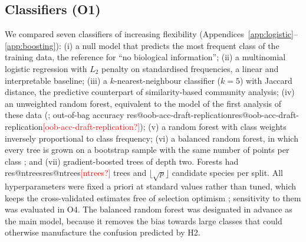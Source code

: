 \documentclass[10pt,a4paper,twocolumn]{article}
\makeatletter
\newcommand{\res}[1]{\ifcsname res@#1\endcsname\csname res@#1\endcsname\else\textcolor{red}{[#1?]}\fi}
\makeatother
\begin{document}
\subsection{Classifiers (O1)}\label{sec:mclassifiers}
We compared seven classifiers of increasing flexibility (Appendices~\ref{app:logistic}--\ref{app:boosting}):
(i) a null model that predicts the most frequent class of the training data, the reference for
``no biological information''; (ii) a multinomial logistic regression with $L_2$ penalty on
standardised frequencies, a linear and interpretable baseline; (iii) a $k$-nearest-neighbour
classifier ($k=5$) with Jaccard distance, the predictive counterpart of similarity-based community
analysis; (iv) an unweighted random forest, equivalent to the model of the first analysis of these
data (\citealp{wright2017}; out-of-bag accuracy \res{oob-acc-draft-replication}); (v) a random forest
with class weights inversely proportional to class frequency; (vi) a balanced random forest, in
which every tree is grown on a bootstrap sample with the same number of points per class
\citep{chen2004}; and (vii) gradient-boosted trees of depth two. Forests had \res{ntrees} trees and
$\lfloor\sqrt{p}\rfloor$ candidate species per split. All hyperparameters were fixed a priori at
standard values rather than tuned, which keeps the cross-validated estimates free of selection
optimism \citep{varma2006}; sensitivity to them was evaluated in O4. The balanced random forest was
designated in advance as the main model, because it removes the bias towards large classes that
could otherwise manufacture the confusion predicted by H2.
\end{document}
